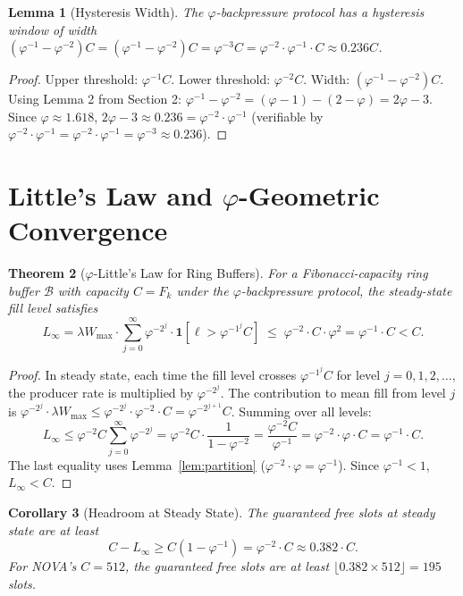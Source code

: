 \documentclass[12pt]{article}
\newtheorem{theorem}{Theorem}
\newtheorem{lemma}[theorem]{Lemma}
\newtheorem{corollary}[theorem]{Corollary}
\newcommand{\PHI}{\varphi}
\newcommand{\PHIINV}{\varphi^{-1}}
\newcommand{\AMOR}{\varphi^{-2}}
\newcommand{\Buf}{\mathcal{B}}
\newcommand{\SCAP}{C}
\begin{document}
\begin{lemma}[Hysteresis Width]
\label{lem:hysteresis}
The $\varphi$-backpressure protocol has a hysteresis window of width
$(\PHIINV - \AMOR)\SCAP = (\PHI^{-1} - \PHI^{-2})\SCAP = \PHI^{-3}\SCAP =
\AMOR \cdot \PHIINV \cdot \SCAP \approx 0.236\SCAP$.
\end{lemma}

\begin{proof}
Upper threshold: $\PHIINV \SCAP$.  Lower threshold: $\AMOR \SCAP$.  Width:
$(\PHIINV - \AMOR)\SCAP$.  Using Lemma 2 from Section 2: $\PHIINV - \AMOR =
(\PHI-1) - (2-\PHI) = 2\PHI - 3$.  Since $\PHI \approx 1.618$, $2\PHI - 3
\approx 0.236 = \AMOR \cdot \PHIINV$ (verifiable by $\AMOR \cdot \PHIINV =
\PHI^{-2}\cdot\PHI^{-1} = \PHI^{-3} \approx 0.236$).
\end{proof}

\section{Little's Law and $\varphi$-Geometric Convergence}
\label{sec:little}

\begin{theorem}[$\varphi$-Little's Law for Ring Buffers]
\label{thm:little-phi}
For a Fibonacci-capacity ring buffer $\Buf$ with capacity $\SCAP = F_k$ under
the $\varphi$-backpressure protocol, the steady-state fill level satisfies
\[
  L_\infty = \lambda W_{\max} \cdot \sum_{j=0}^{\infty} \AMOR^j \cdot
  \mathbf{1}[\ell > \PHIINV^j \SCAP] \;\le\; \AMOR \cdot \SCAP \cdot \PHI^2
  = \PHIINV \cdot \SCAP < \SCAP.
\]
\end{theorem}

\begin{proof}
In steady state, each time the fill level crosses $\PHIINV^j \SCAP$ for level
$j = 0, 1, 2, \ldots$, the producer rate is multiplied by $\AMOR^j$.  The
contribution to mean fill from level $j$ is $\AMOR^j \cdot \lambda W_{\max}
\le \AMOR^j \cdot \AMOR \cdot \SCAP = \AMOR^{j+1} \SCAP$.  Summing over all
levels:
\[
  L_\infty \le \AMOR \SCAP \sum_{j=0}^{\infty} \AMOR^j = \AMOR \SCAP \cdot
  \frac{1}{1-\AMOR} = \frac{\AMOR \SCAP}{\PHIINV} = \AMOR \cdot \PHI \cdot \SCAP
  = \PHIINV \cdot \SCAP.
\]
The last equality uses Lemma~\ref{lem:partition} ($\AMOR \cdot \PHI = \PHIINV$).
Since $\PHIINV < 1$, $L_\infty < \SCAP$.
\end{proof}

\begin{corollary}[Headroom at Steady State]
The guaranteed free slots at steady state are at least
\[
  \SCAP - L_\infty \ge \SCAP(1 - \PHIINV) = \AMOR \cdot \SCAP \approx 0.382
  \cdot \SCAP.
\]
For NOVA's $\SCAP = 512$, the guaranteed free slots are at least
$\lfloor 0.382 \times 512 \rfloor = 195$ slots.
\end{corollary}
\end{document}
